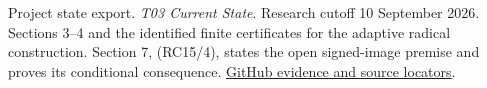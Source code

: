 Project state export. \emph{T03 Current State}. Research cutoff 10 September 2026. Sections 3--4 and the identified finite certificates for the adaptive radical construction. Section 7, (RC15/4), states the open signed-image premise and proves its conditional consequence. \href{https://github.com/hnt119/polynomial-image-compression/blob/bd1f2d663262821575eebdfa559b7c25f76b46ab/research/exports/2026-11-05-report-references/README.md#ref14}{GitHub evidence and source locators}.
